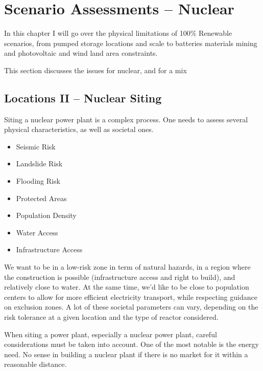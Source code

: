 \setchapterpreamble[u]{\margintoc}
\chapter{Scenario Assessments -- Nuclear}

In this chapter I will go over the physical limitations of 100\% Renewable scenarios, from pumped storage locations and scale to batteries materials mining and photovoltaic and wind land area constraints.

This section discusses the issues for nuclear, and for a mix

\section{Locations II -- Nuclear Siting}

Siting a nuclear power plant is a complex process. One needs to assess several physical characteristics, as well as societal ones.

\begin{itemize}
\item Seismic Risk
\item Landslide Risk
\item Flooding Risk
\item Protected Areas
\item Population Density
\item Water Access
\item Infrastructure Access
\end{itemize}

We want to be in a low-risk zone in term of natural hazards, in a region where the construction is possible (infrastructure access and right to build), and relatively close to water. At the same time, we'd like to be close to population centers to allow for more efficient electricity transport, while respecting guidance on exclusion zones. A lot of these societal parameters can vary, depending on the risk tolerance at a given location and the type of reactor considered.

When siting a power plant, especially a nuclear power plant, careful considerations must be taken into account. One of the most notable is the energy need. No sense in building a nuclear plant if there is no market for it within a reasonable distance.


